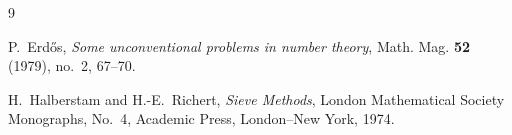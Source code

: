 \documentclass[a4paper,11pt]{amsart}
\begin{document}
\begin{thebibliography}{9}

P.~Erdős,
\emph{Some unconventional problems in number theory},
Math. Mag. \textbf{52} (1979), no.~2, 67--70.

H.~Halberstam and H.-E.~Richert,
\emph{Sieve Methods},
London Mathematical Society Monographs, No.~4,
Academic Press, London--New York, 1974.

\end{thebibliography}
\end{document}
